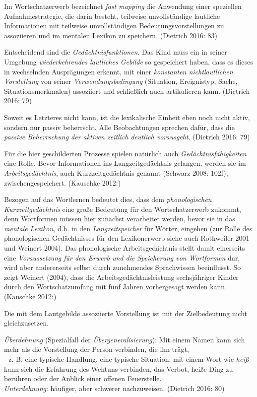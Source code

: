\documentclass[
  letterpaper,
]{scrbook}
\begin{document}
Im Wortschatzerwerb bezeichnet \emph{fast mapping} die Anwendung einer
speziellen Aufnahmestrategie, die darin besteht, teilweise
unvollständige lautliche Informationen mit teilweise unvollständigen
Bedeutungsvorstellungen zu assoziieren und im mentalen Lexikon zu
speichern. (Dietrich 2016: 83)

Entscheidend sind die \emph{Gedächtnisfunktionen}. Das Kind muss ein in
seiner Umgebung \emph{wiederkehrendes lautliches Gebilde} so gespeichert
haben, dass es dieses in wechselnden Ausprägungen erkennt, mit einer
\emph{konstanten nichtlautlichen Vorstellung} von seiner
\emph{Verwendungsbedingung} (Situation, Ereignistyp, Sache,
Situationsmerkmalen) assoziiert und schließlich auch artikulieren kann.
(Dietrich 2016: 79)

Soweit es Letzteres nicht kann, ist die lexikalische Einheit eben noch
nicht aktiv, sondern nur passiv beherrscht. Alle Beobachtungen sprechen
dafür, dass die \emph{passive Beherrschung der aktiven zeitlich deutlich
vorausgeht}. (Dietrich 2016: 79)

Für die hier geschilderten Prozesse spielen natürlich auch
\emph{Gedächtnisfähigkeiten} eine Rolle. Bevor Informationen ins
Langzeitgedächtnis gelangen, werden sie im \emph{Arbeitsgedächtnis},
auch Kurzzeitgedächtnis genannt (Schwarz 2008: 102f),
zwischengespeichert. (Kauschke 2012:)

Bezogen auf das Wortlernen bedeutet dies, dass dem \emph{phonologischen
Kurzzeitgedächtnis} eine große Bedeutung für den Wortschatzerwerb
zukommt, denn Wortformen müssen hier zunächst verarbeitet werden, bevor
sie in das \emph{mentale Lexikon}, d.h. in den \emph{Langzeitspeicher}
für Wörter, eingehen (zur Rolle des phonologischen Gedächtnisses für den
Lexikonerwerb siehe auch Rothweiler 2001 und Weinert 2004). Das
phonologische Arbeitsgedächtnis stellt damit einerseits eine
\emph{Voraussetzung für den Erwerb und die Speicherung von Wortformen}
dar, wird aber andererseits selbst durch zunehmendes Sprachwissen
beeinflusst. So zeigt Weinert (2004), dass die Arbeitsgedächtnisleistung
sechsjähriger Kinder durch den Wortschatzumfang mit fünf Jahren
vorhergesagt werden kann. (Kauschke 2012:)

Die mit dem Lautgebilde assoziierte Vorstellung ist mit der
Zielbedeutung nicht gleichzusetzen.

\emph{Überdehnung} (Spezialfall der \emph{Übergeneralisierung}): Mit
einem Namen kann sich mehr als die Vorstellung der Person verbinden, die
ihn trägt,\\
- z. B. eine typische Handlung, eine typische Situation; mit einem Wort
wie \emph{heiß} kann sich die Erfahrung des Wehtuns verbinden, das
Verbot, heiße Ding zu berühren oder der Anblick einer offenen
Feuerstelle.\\
\emph{Unterdehnung}: häufiger, aber schwerer nachzuweisen. (Dietrich
2016: 80)
\end{document}

